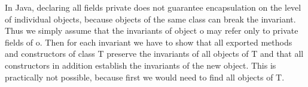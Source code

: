 \begin{mytitle} In Java, declaring all fields private does not guarantee encapsulation on the level of individual objects, because objects of the same class can break the invariant. Thus we simply assume that the invariants of object o may refer only to private fields of o. Then for each invariant we have to show that all exported methods and constructors of class T preserve the invariants of all objects of T and that all constructors in addition establish the invariants of the new object. This is practically not possible, because first we would need to find all objects of T.
\end{mytitle}

